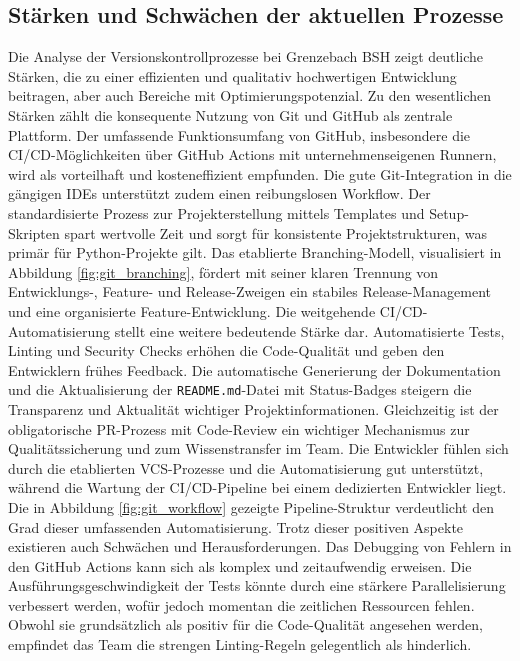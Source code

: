 \documentclass[12pt,oneside]{article}
\begin{document}
    \subsection{Stärken und Schwächen der aktuellen Prozesse}
    \label{subsec:ss_vk}
    Die Analyse der Versionskontrollprozesse bei Grenzebach BSH zeigt deutliche Stärken, die zu einer effizienten und qualitativ hochwertigen Entwicklung beitragen, aber auch Bereiche mit Optimierungspotenzial.
    \newline
    Zu den wesentlichen Stärken zählt die konsequente Nutzung von Git und GitHub als zentrale Plattform. Der umfassende Funktionsumfang von GitHub, insbesondere die CI/CD-Möglichkeiten über GitHub Actions mit unternehmenseigenen Runnern, wird als vorteilhaft und kosteneffizient empfunden. Die gute Git-Integration in die gängigen IDEs unterstützt zudem einen reibungslosen Workflow. Der standardisierte Prozess zur Projekterstellung mittels Templates und Setup-Skripten spart wertvolle Zeit und sorgt für konsistente Projektstrukturen, was primär für Python-Projekte gilt. Das etablierte Branching-Modell, visualisiert in Abbildung \ref{fig:git_branching}, fördert mit seiner klaren Trennung von Entwicklungs-, Feature- und Release-Zweigen ein stabiles Release-Management und eine organisierte Feature-Entwicklung.
    \newline
    Die weitgehende CI/CD-Automatisierung stellt eine weitere bedeutende Stärke dar. Automatisierte Tests, Linting und Security Checks erhöhen die Code-Qualität und geben den Entwicklern frühes Feedback. Die automatische Generierung der Dokumentation und die Aktualisierung der \texttt{README.md}-Datei mit Status-Badges steigern die Transparenz und Aktualität wichtiger Projektinformationen. Gleichzeitig ist der obligatorische PR-Prozess mit Code-Review ein wichtiger Mechanismus zur Qualitätssicherung und zum Wissenstransfer im Team. Die Entwickler fühlen sich durch die etablierten VCS-Prozesse und die Automatisierung gut unterstützt, während die Wartung der CI/CD-Pipeline bei einem dedizierten Entwickler liegt. Die in Abbildung \ref{fig:git_workflow} gezeigte Pipeline-Struktur verdeutlicht den Grad dieser umfassenden Automatisierung.
    \newline
    Trotz dieser positiven Aspekte existieren auch Schwächen und Herausforderungen. Das Debugging von Fehlern in den GitHub Actions kann sich als komplex und zeitaufwendig erweisen. Die Ausführungsgeschwindigkeit der Tests könnte durch eine stärkere Parallelisierung verbessert werden, wofür jedoch momentan die zeitlichen Ressourcen fehlen. Obwohl sie grundsätzlich als positiv für die Code-Qualität angesehen werden, empfindet das Team die strengen Linting-Regeln gelegentlich als hinderlich.
\end{document}
